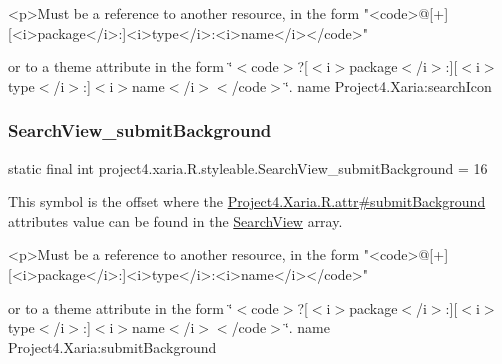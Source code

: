 \begin{DoxyVerb}      <p>Must be a reference to another resource, in the form "<code>@[+][<i>package</i>:]<i>type</i>:<i>name</i></code>"
\end{DoxyVerb}
 or to a theme attribute in the form \char`\"{}$<$code$>$?\mbox{[}$<$i$>$package$<$/i$>$\+:\mbox{]}\mbox{[}$<$i$>$type$<$/i$>$\+:\mbox{]}$<$i$>$name$<$/i$>$$<$/code$>$\char`\"{}.  name Project4.\+Xaria\+:search\+Icon \mbox{\label{classproject4_1_1xaria_1_1R_1_1styleable_a0f597ce0d22c799517c8d6d3e194a1c0}} 
\subsubsection{\texorpdfstring{Search\+View\+\_\+submit\+Background}{SearchView\_submitBackground}}
{\footnotesize\ttfamily static final int project4.\+xaria.\+R.\+styleable.\+Search\+View\+\_\+submit\+Background = 16\hspace{0.3cm}{\ttfamily [static]}}

This symbol is the offset where the \hyperlink{}{Project4.\+Xaria.\+R.\+attr\#submit\+Background} attribute\textquotesingle{}s value can be found in the \hyperlink{classproject4_1_1xaria_1_1R_1_1styleable_a6308d960f6e1e05e5316efa4904fedfc}{Search\+View} array.

\begin{DoxyVerb}      <p>Must be a reference to another resource, in the form "<code>@[+][<i>package</i>:]<i>type</i>:<i>name</i></code>"
\end{DoxyVerb}
 or to a theme attribute in the form \char`\"{}$<$code$>$?\mbox{[}$<$i$>$package$<$/i$>$\+:\mbox{]}\mbox{[}$<$i$>$type$<$/i$>$\+:\mbox{]}$<$i$>$name$<$/i$>$$<$/code$>$\char`\"{}.  name Project4.\+Xaria\+:submit\+Background \mbox{\label{classproject4_1_1xaria_1_1R_1_1styleable_ac24e80493308e5cd30e2dfffff0bec9d}} 
